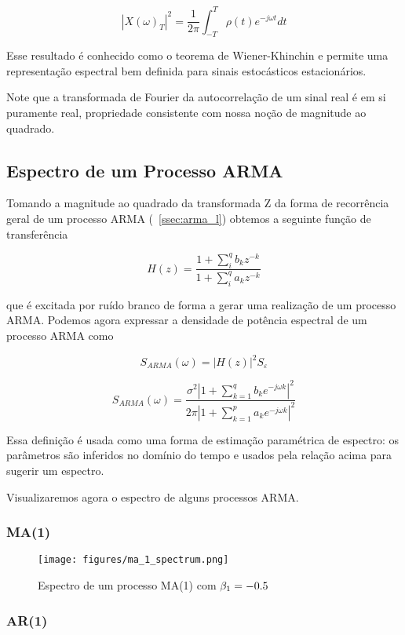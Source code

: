 $$|X(\omega)_T|^2 = \frac{1}{2\pi}\int_{-T}^{T} \rho(t)e^{-j \omega t}dt$$

Esse resultado é conhecido como o teorema de Wiener-Khinchin e permite uma
representação espectral bem definida para sinais estocásticos estacionários.

Note que a transformada de Fourier da autocorrelação de um sinal real é
em si puramente real, propriedade consistente com nossa noção de magnitude ao
quadrado.

\subsection{Espectro de um Processo ARMA}

Tomando a magnitude ao quadrado da transformada Z da forma de recorrência
geral de um processo ARMA (~\ref{ssec:arma_l}) obtemos a seguinte função de
transferência

$$ H(z) = \frac{1 + \sum_{i}^{q} b_k z^{-k}}{1 + \sum_{i}^{q} a_k z^{-k}} $$

que é excitada por ruído branco de forma a gerar uma realização de um processo
ARMA. Podemos agora expressar a densidade de potência espectral de um processo
ARMA como

$$ S_{ARMA}(\omega) = |H(z)|^2 S_{\varepsilon} $$

\begin{equation}\label{eq:arma_spectrum}
     S_{ARMA}(\omega) = \frac{\sigma^2 |1 + \sum_{k=1}^{q} b_k e^{-j\omega k}|^2}{2\pi|1 + \sum_{k=1}^{p} a_k e^{-j\omega k}|^2}
\end{equation}

Essa definição é usada como uma forma de estimação paramétrica de espectro:
os parâmetros são inferidos no domínio do tempo e usados pela relação acima
para sugerir um espectro.

Visualizaremos agora o espectro de alguns processos ARMA.

\subsubsection{MA(1)}

\begin{figure}[H]
    \centering
    \texttt{[image: figures/ma\_1\_spectrum.png]}
    \caption{Espectro de um processo MA(1) com
    $\protect \beta_1 = -0.5$}
    \label{fig:ma_1_spectrum}
\end{figure}

\subsubsection{AR(1)}

